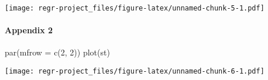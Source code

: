 \documentclass[
]{article}
\newenvironment{Shaded}{\begin{snugshade}}{\end{snugshade}}
\newcommand{\AttributeTok}[1]{\textcolor[rgb]{0.77,0.63,0.00}{#1}}
\newcommand{\DecValTok}[1]{\textcolor[rgb]{0.00,0.00,0.81}{#1}}
\newcommand{\FunctionTok}[1]{\textcolor[rgb]{0.00,0.00,0.00}{#1}}
\newcommand{\NormalTok}[1]{#1}
\begin{document}
\texttt{[image: regr-project\_files/figure-latex/unnamed-chunk-5-1.pdf]}

\hypertarget{appendix-2}{%
\paragraph{Appendix 2}\label{appendix-2}}

\begin{Shaded}
\begin{Highlighting}[]
\FunctionTok{par}\NormalTok{(}\AttributeTok{mfrow =} \FunctionTok{c}\NormalTok{(}\DecValTok{2}\NormalTok{, }\DecValTok{2}\NormalTok{))}
\FunctionTok{plot}\NormalTok{(st)}
\end{Highlighting}
\end{Shaded}

\texttt{[image: regr-project\_files/figure-latex/unnamed-chunk-6-1.pdf]}
\end{document}
